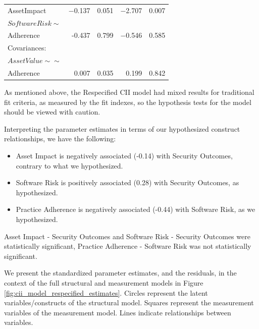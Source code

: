 \begin{table}
\begin{center}
\begin{tabular}{l|rrrr}
			AssetImpact     &   $-$0.137  &  0.051  &  $-$2.707 &   0.007\\
			$SoftwareRisk \sim$        & & & & \\                                  
			Adherence     &    -0.437 &   0.799  &  $-$0.546 &   0.585\\
			Covariances:  & & & & \\  
			$AssetValue \sim\sim$          & & & & \\                                 
			Adherence      &  0.007  &  0.035 &  0.199 &   0.842\\
		\end{tabular}
	\end{center}
\end{table}

As mentioned above, the Respecified CII model had mixed results for traditional fit criteria, as measured by the fit indexes, so the hypothesis tests for the model should be viewed with caution. 

Interpreting the parameter estimates in terms of our hypothesized construct relationships, we have the following:
\begin{itemize}
	\item  Asset Impact is negatively associated (-0.14) with Security Outcomes, contrary to what we hypothesized.
	\item Software Risk is positively associated (0.28) with Security Outcomes, as hypothesized. 
	\item Practice Adherence is negatively associated (-0.44) with Software Risk,  
	as we hypothesized. 
\end{itemize}	
Asset Impact - Security Outcomes and Software Risk - Security Outcomes were statistically significant, Practice Adherence - Software Risk was not statistically significant. 

We present the standardized parameter estimates, and the residuals, in the context of the full structural and measurement models in Figure \ref{fig:cii_model_respecified_estimates}. Circles represent the latent variables/constructs of the structural model. Squares represent the measurement variables of the measurement model. Lines indicate relationships between variables.

